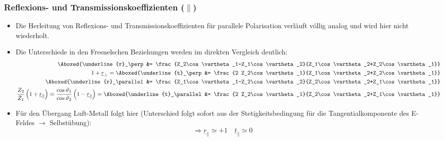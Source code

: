 \begin{frame}
  \frametitle{Reflexions- und Transmissionskoeffizienten (\(\parallel\))}  
  \begin{itemize}[<+->]
  \item Die Herleitung von Reflexions- und Transmissionskoeffizienten für \alert{parallele Polarisation} verläuft völlig analog und wird hier nicht wiederholt.
  \item Die Unterschiede in den \alert{Fresnelschen Beziehungen} werden im direkten Vergleich deutlich:
    \begin{align*}
\Aboxed{\underline{r}_\perp &= \frac{Z_2\cos\vartheta_1-Z_1\cos\vartheta_2}{Z_1\cos\vartheta_2+Z_2\cos\vartheta_1}} \\
      1+\underline{r}_\perp =
\Aboxed{\underline{t}_\perp &= \frac{2 Z_2\cos\vartheta_1}{Z_1\cos\vartheta_2+Z_2\cos\vartheta_1}} \\
\Aboxed{\underline{r}_\parallel &= \frac{Z_1\cos\vartheta_1-Z_2\cos\vartheta_2}{Z_2\cos\vartheta_2+Z_1\cos\vartheta_1}} \\
      \frac{Z_2}{Z_1}\left(1+\underline{r}_\parallel\right)=\frac{\cos\vartheta_1}{\cos\vartheta_2}\left(1-\underline{r}_\parallel\right)
= \Aboxed{\underline{t}_\parallel &= \frac{2 Z_2\cos\vartheta_1}{Z_2\cos\vartheta_2+Z_1\cos\vartheta_1}} 
    \end{align*}
\item Für den Übergang Luft-Metall folgt hier (Unterschied folgt sofort aus der Stetigkeitsbedingung für die Tangentialkomponente des E-Feldes \(\to\) Selbstübung):     
    \begin{equation*}
    \Rightarrow \boxed{\underline{r}_\parallel \simeq +1 \quad \underline{t}_\parallel \simeq 0}
    \end{equation*}
\end{itemize}
\end{frame}

